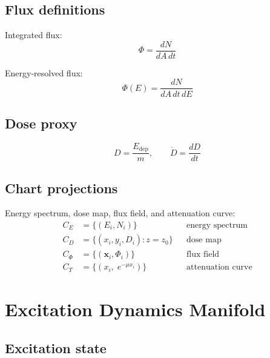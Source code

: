 \documentclass[11pt, a4paper, oneside]{article}
\newcommand{\xvec}{\mathbf{x}}
\begin{document}
\subsection{Flux definitions}

Integrated flux:
\begin{equation}
  \Phi = \frac{dN}{dA\,dt}
  \label{eq:flux_def}
\end{equation}

Energy-resolved flux:
\begin{equation}
  \Phi(E) = \frac{dN}{dA\,dt\,dE}
  \label{eq:flux_energy}
\end{equation}

\subsection{Dose proxy}

\begin{equation}
  D = \frac{E_{\mathrm{dep}}}{m}, \qquad
  \dot{D} = \frac{dD}{dt}
  \label{eq:dose}
\end{equation}

\subsection{Chart projections}

Energy spectrum, dose map, flux field, and attenuation curve:
\begin{align}
  C_E         &= \{(E_i, N_i)\}
  && \text{energy spectrum} \label{eq:c_espect} \\[4pt]
  C_D         &= \{(x_i, y_i, D_i) : z = z_0\}
  && \text{dose map} \label{eq:c_dose} \\[4pt]
  C_\Phi      &= \{(\xvec_i, \Phi_i)\}
  && \text{flux field} \label{eq:c_flux} \\[4pt]
  C_T         &= \{(x_i,\; e^{-\mu x_i})\}
  && \text{attenuation curve} \label{eq:c_atten}
\end{align}

\section{Excitation Dynamics Manifold}
\label{sec:excitation}

\subsection{Excitation state}
\end{document}
